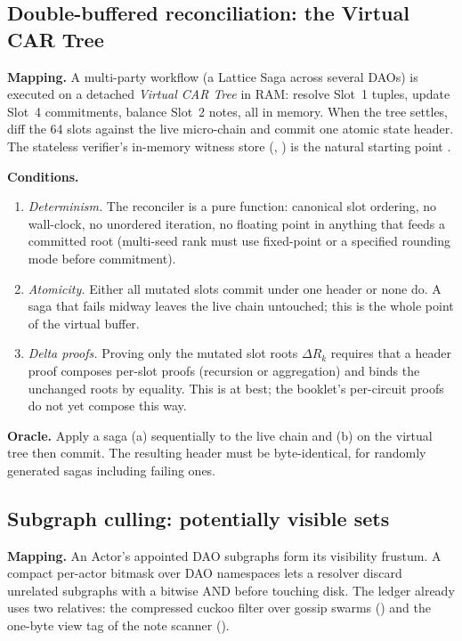 \documentclass[a4paper,11pt,twoside,parskip=half-,headings=small]{scrartcl}
\begin{document}
\subsection{Double-buffered reconciliation: the Virtual CAR Tree}

\textbf{Mapping.} A multi-party workflow (a Lattice Saga across several DAOs) is executed on a detached \emph{Virtual CAR Tree} in RAM: resolve Slot~1 tuples,
update Slot~4 commitments, balance Slot~2 notes, all in memory. When the tree settles, diff the 64 slots against the live micro-chain and commit one atomic state header.
The stateless verifier's in-memory witness store (, ) is the natural starting point .

\textbf{Conditions.}
\begin{enumerate}[nosep]
  \item \emph{Determinism.} The reconciler is a pure function: canonical slot ordering, no wall-clock, no unordered iteration, no floating point in anything that feeds a committed root
        (multi-seed rank must use fixed-point or a specified rounding mode before commitment).
  \item \emph{Atomicity.} Either all mutated slots commit under one header or none do. A saga that fails midway leaves the live chain untouched; this is the whole point of the virtual buffer.
  \item \emph{Delta proofs.} Proving only the mutated slot roots $\Delta R_k$ requires that a header proof composes per-slot proofs (recursion or aggregation) and binds the unchanged roots by equality.
        This is \stSpec{} at best; the booklet's per-circuit proofs do not yet compose this way.
\end{enumerate}

\textbf{Oracle.} Apply a saga (a) sequentially to the live chain and (b) on the virtual tree then commit. The resulting header must be byte-identical, for randomly generated sagas including failing ones.

\subsection{Subgraph culling: potentially visible sets}

\textbf{Mapping.} An Actor's appointed DAO subgraphs form its visibility frustum. A compact per-actor bitmask over DAO namespaces lets a resolver discard unrelated subgraphs with a bitwise AND before touching disk. The ledger already uses two relatives:
the compressed cuckoo filter over gossip swarms () and the one-byte view tag of the note scanner ().
\end{document}
